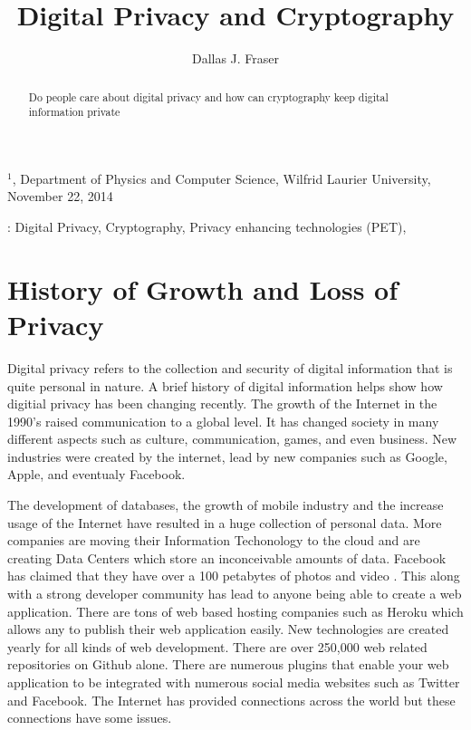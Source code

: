 \documentclass[12pt]{article}
\title{Digital Privacy and Cryptography}
\author{
	Dallas J. Fraser\inst{1}
}
\def\inst#1{$^{#1}$}
\begin{document}
\maketitle

\begin{center}
{\footnotesize

\inst{1}, Department of Physics and Computer Science, Wilfrid Laurier 
University, November 22, 2014}

\end{center}

\begin{abstract}
Do people care about digital privacy and how can cryptography keep digital information private
\end{abstract}

: Digital Privacy, Cryptography, Privacy enhancing technologies (PET),

\clearpage

\section{History of Growth and Loss of Privacy}\label{sec:history}

Digital privacy refers to the collection and security of digital information that is quite personal in nature. A brief history of digital information helps show how digitial privacy has been changing recently. The growth of the Internet in the 1990's raised communication to a global level. It has changed society in many different aspects such as culture, communication, games, and even business. New industries were created by the internet, lead by new companies such as Google, Apple, and eventualy Facebook.

The development of databases, the growth of mobile industry  and the increase usage of the Internet have resulted in a huge collection of personal data. More companies are moving their Information Techonology to the cloud and are creating Data Centers which store an inconceivable amounts of data. Facebook has claimed that they have over a 100 petabytes of photos and video \cite{Wallbank}. This along with a strong developer community has lead to anyone being able to create a web application. There are tons of web based hosting companies such as Heroku which allows any to publish their web application easily. New technologies are created yearly for all kinds of web development. There are over 250,000 web related repositories on Github alone. There are numerous plugins that enable your web application to be integrated with numerous social media websites such as Twitter and Facebook. The Internet has provided connections across the world but these connections have some issues.
\end{document}
